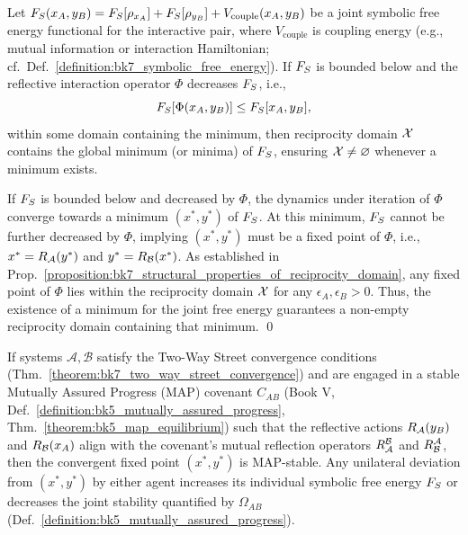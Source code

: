 \begin{lemma}
\label{lemma:bk7_non_triviality_via_convergence_potential}
Let \(F_S(x_A, y_B) = F_S[\rho_{x_A}] + F_S[\rho_{y_B}] + V_{\mathrm{couple}}(x_A, y_B)\) be a joint symbolic free energy functional for the interactive pair, where \(V_{\mathrm{couple}}\) is coupling energy (e.g., mutual information or interaction Hamiltonian; cf.~Def.~\ref{definition:bk7_symbolic_free_energy}).
If \(F_S\) is bounded below and the reflective interaction operator \(\Phi\) decreases \(F_S\), i.e.,
\[
F_S[\Phi(x_A, y_B)] \le F_S[x_A, y_B],
\]
within some domain containing the minimum, then reciprocity domain \(\mathcal{X}\) contains the global minimum (or minima) of \(F_S\), ensuring \(\mathcal{X} \neq \varnothing\) whenever a minimum exists.
\end{lemma}
\begin{demonstratio}
\label{demonstratio:bk7_free_energy_minimum_in_reciprocity_domain}
If \(F_S\) is bounded below and decreased by \(\Phi\), the dynamics under iteration of \(\Phi\) converge towards a minimum \((x^{\ast}, y^{\ast})\) of \(F_S\). At this minimum, \(F_S\) cannot be further decreased by \(\Phi\), implying \((x^{\ast}, y^{\ast})\) must be a fixed point of \(\Phi\), i.e., \(x^{\ast} = R_{\mathcal{A}}(y^{\ast})\) and \(y^{\ast} = R_{\mathcal{B}}(x^{\ast})\). As established in Prop.~\ref{proposition:bk7_structural_properties_of_reciprocity_domain}, any fixed point of \(\Phi\) lies within the reciprocity domain \(\mathcal{X}\) for any \(\epsilon_A, \epsilon_B > 0\). Thus, the existence of a minimum for the joint free energy guarantees a non-empty reciprocity domain containing that minimum. \qed \end{demonstratio}
\begin{propositio}
\label{proposition:bk7_map_compatible_reciprocity}
If systems \(\mathcal{A},\mathcal{B}\) satisfy the Two-Way Street convergence conditions (Thm.~\ref{theorem:bk7_two_way_street_convergence}) and are engaged in a stable Mutually Assured Progress (MAP) covenant \(C_{AB}\) (Book V, Def.~\ref{definition:bk5_mutually_assured_progress}, Thm.~\ref{theorem:bk5_map_equilibrium}) such that the reflective actions \(R_{\mathcal{A}}(y_B)\) and \(R_{\mathcal{B}}(x_A)\) align with the covenant's mutual reflection operators \(R^{\mathcal{B}}_{\mathcal{A}}\) and \(R^{\mathcal{A}}_{\mathcal{B}}\), then the convergent fixed point \((x^{\ast}, y^{\ast})\) is MAP-stable. Any unilateral deviation from \((x^{\ast}, y^{\ast})\) by either agent increases its individual symbolic free energy \(F_S\) or decreases the joint stability quantified by \(\Omega_{AB}\) (Def.~\ref{definition:bk5_mutually_assured_progress}).
\end{propositio}
